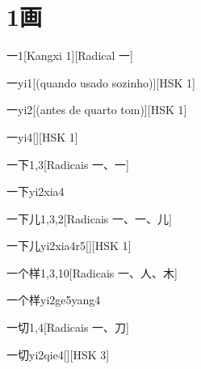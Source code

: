 
\section*{1画}

\begin{entry}{一}{1}[Kangxi 1][Radical ⼀]
  \begin{phonetics}{一}{yi1}[(quando usado sozinho)][HSK 1]
  \end{phonetics}
  \begin{phonetics}{一}{yi2}[(antes de quarto tom)][HSK 1]
  \end{phonetics}
  \begin{phonetics}{一}{yi4}[][HSK 1]
  \end{phonetics}
\end{entry}

\begin{entry}{一下}{1,3}[Radicais ⼀、⼀]
  \begin{phonetics}{一下}{yi2xia4}
  \end{phonetics}
\end{entry}

\begin{entry}{一下儿}{1,3,2}[Radicais ⼀、⼀、⼉]
  \begin{phonetics}{一下儿}{yi2xia4r5}[][HSK 1]
  \end{phonetics}
\end{entry}

\begin{entry}{一个样}{1,3,10}[Radicais ⼀、⼈、⽊]
  \begin{phonetics}{一个样}{yi2ge5yang4}
  \end{phonetics}
\end{entry}

\begin{entry}{一切}{1,4}[Radicais ⼀、⼑]
  \begin{phonetics}{一切}{yi2qie4}[][HSK 3]
  \end{phonetics}
\end{entry}

